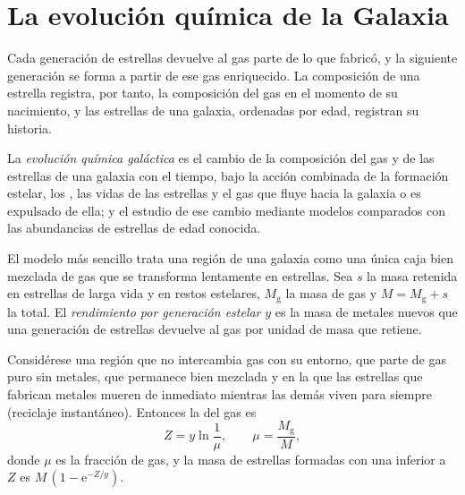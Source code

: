 \section{La evolución química de la Galaxia}\label{sec:b3:origin-of-elements:gce}

Cada generación de estrellas devuelve al gas parte de lo que fabricó, y la siguiente
generación se forma a partir de ese gas enriquecido. La composición de una estrella
registra, por tanto, la composición del gas en el momento de su nacimiento, y las
estrellas de una galaxia, ordenadas por edad, registran su historia.

\begin{definition}\label{def:b3:origin-of-elements:gce}
La \emph{evolución química galáctica}
es el cambio de la composición del gas y de las estrellas de una galaxia con el
tiempo, bajo la acción combinada de la formación estelar, los , las vidas de las estrellas y el gas que fluye hacia la galaxia o es
expulsado de ella; y el estudio de ese cambio mediante modelos comparados con las
abundancias de estrellas de edad conocida.
\end{definition}

El modelo más sencillo trata una región de una galaxia como una única caja bien
mezclada de gas que se transforma lentamente en estrellas. Sea $s$ la masa retenida
en estrellas de larga vida y en restos estelares, $M_\mathrm{g}$ la masa de gas y
$M = M_\mathrm{g} + s$ la total. El \emph{rendimiento por generación estelar} $y$ es
la masa de metales nuevos que una generación de estrellas devuelve al gas por unidad
de masa que retiene.

\begin{theorem}\label{thm:b3:origin-of-elements:closed-box}
Considérese una región que no intercambia gas con su entorno, que parte de gas puro
sin metales, que permanece bien mezclada y en la que las estrellas que fabrican
metales mueren de inmediato mientras las demás viven para siempre (reciclaje
instantáneo). Entonces la  del gas es
\[
Z = y \ln\frac{1}{\mu}, \qquad \mu = \frac{M_\mathrm{g}}{M},
\]
donde $\mu$ es la fracción de gas, y la masa de estrellas formadas con una
 inferior a $Z$ es \mbox{$M\,(1 - \mathrm{e}^{-Z/y})$}.
\end{theorem}

